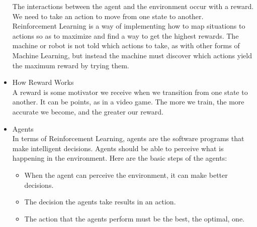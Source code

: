 \documentclass[14pt,a4paper]{report}  %
\begin{document}
\begin{itemize}
The interactions between the agent and the environment occur with a reward. 
We need to take an action to move from one state to another.\\
Reinforcement Learning is a way of implementing how to map situations to actions 
so as to maximize and find a way to get the highest rewards.
The machine or robot is not told which actions to take, as with other forms of 
Machine Learning, but instead the machine must discover which actions yield the 
maximum reward by trying them.\\
\item How Reward Works\\
A reward is some motivator we receive when we transition from one state to another. It 
can be points, as in a video game. The more we train, the more accurate we become, and 
the greater our reward.\\
\item Agents\\
In terms of Reinforcement Learning, agents are the software programs that make
intelligent decisions. Agents should be able to perceive what is happening in the
environment. Here are the basic steps of the agents:\\
\begin{itemize}
\item When the agent can perceive the environment, it can make
better decisions.
\end{itemize}
\begin{itemize}
\item The decision the agents take results in an action.
\end{itemize}
\begin{itemize}
\item The action that the agents perform must be the best, the
optimal, one.
\end{itemize}


\end{itemize}
\end{document}
